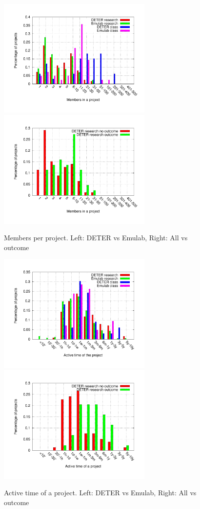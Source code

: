 \begin{figure}[htbp] \begin{center} \includegraphics[width=3in,
type=pdf,ext=.pdf,read=.pdf]{figs/proj.user.gnu}
\includegraphics[width=3in,
type=pdf,ext=.pdf,read=.pdf]{figs/proj.user.cmp.gnu} \caption{Members
per project. Left: DETER vs Emulab, Right: All vs outcome}
\label{projuser} \end{center} \end{figure}

\begin{figure}[htbp] \begin{center} \includegraphics[width=3in,
type=pdf,ext=.pdf,read=.pdf]{figs/proj.active.gnu}
\includegraphics[width=3in,
type=pdf,ext=.pdf,read=.pdf]{figs/proj.active.cmp.gnu} \caption{Active
time of a project. Left: DETER vs Emulab, Right: All vs outcome}
\label{projactive} \end{center} \end{figure}


